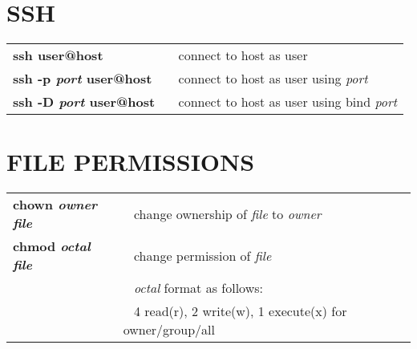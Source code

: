 \documentclass[10pt,landscape]{article}
\begin{document}
\begin{multicols}{2}
\section{SSH}
\begin{tabular}{@{\hspace{1mm}}ll@{}}
{\bfseries ssh user@host} &~ connect to host as user \\
{\bfseries ssh -p {\em port} user@host} &~ connect to host as user using {\em port} \\
{\bfseries ssh -D {\em port} user@host} &~ connect to host as user using bind {\em port} \\
\end{tabular}

\section{FILE PERMISSIONS}
\begin{tabular}{@{\hspace{1mm}}ll@{}}
{\bfseries chown {\em owner file}} &~ change ownership of {\em file} to {\em owner} \\
{\bfseries chmod {\em octal file}} &~ change permission of {\em file} \\
&~ {\em octal} format as follows: \\
&~ 4 read(r), 2 write(w), 1 execute(x) for owner/group/all \\
\end{tabular}

\end{multicols}
\end{document}
